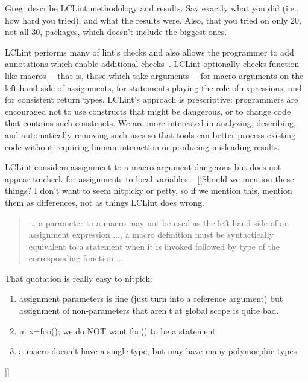 \documentclass[10pt]{article}
\begin{document}
Greg:  describe LCLint methodology and results.  Say exactly what you did
(i.e., how hard you tried), and what the results were.  Also, that you tried
on only 20, not all 30, packages, which doesn't include the biggest ones.


LCLint performs many of lint's checks and also
allows the programmer to add annotations which enable additional
checks~\cite{Evans-pldi96,Evans-fse94}.
LCLint optionally checks function-like
macros\,---\,that is, those which take arguments\,---\,for
macro arguments on the left hand side of assignments, for statements
playing the role of expressions, and for consistent return types.
LCLint's approach is prescriptive: programmers are encouraged not to use
constructs that might be dangerous, or to change code that contains such
constructs.  We are more interested in analyzing, describing, and
automatically removing such uses so that tools can better process existing
code without requiring human interaction or producing misleading results.

LCLint
considers assignment to a macro argument dangerous but does not appear
to check for assignments to local variables.~\cite[\S 8]{Evans:LCLint}
[[Should we mention these things?  I don't want to seem nitpicky or petty, so
if we mention this, mention them as differences, not as things LCLint does
wrong.
\begin{quote}
$\ldots$ a parameter to a macro may not be used as the left hand side
of an assignment expression $\ldots$, a macro definition must be
syntactically equivalent to a statement when it is invoked followed by
type of the corresponding function $\ldots$~\cite[\S 8]{Evans:LCLint}
\end{quote}
That quotation is really easy to nitpick:
\begin{enumerate}
 \item assignment parameters is fine (just turn into a reference argument) but
    assignment of non-parameters that aren't at global scope is quite bad.
 \item in x=foo(); we do NOT want foo() to be a statement
 \item a macro doesn't have a single type, but may have many polymorphic types
\end{enumerate}
]]


\end{document}
